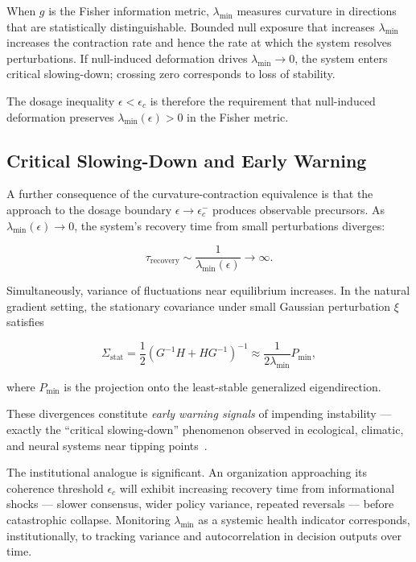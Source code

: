\documentclass[11pt]{article}
\theoremstyle{remark}
\begin{document}
When $g$ is the Fisher information metric, $\lambda_{\min}$ measures curvature in directions that are statistically distinguishable. Bounded null exposure that increases $\lambda_{\min}$ increases the contraction rate and hence the rate at which the system resolves perturbations. If null-induced deformation drives $\lambda_{\min} \to 0$, the system enters critical slowing-down; crossing zero corresponds to loss of stability.

The dosage inequality $\epsilon < \epsilon_c$ is therefore the requirement that null-induced deformation preserves $\lambda_{\min}(\epsilon) > 0$ in the Fisher metric.

\subsection{Critical Slowing-Down and Early Warning}
\label{sec:slowing_down}

A further consequence of the curvature-contraction equivalence is that the approach to the dosage boundary $\epsilon \to \epsilon_c^-$ produces observable precursors. As $\lambda_{\min}(\epsilon) \to 0$, the system's recovery time from small perturbations diverges:

\[
\tau_{\text{recovery}} \sim \frac{1}{\lambda_{\min}(\epsilon)} \to \infty.
\]

Simultaneously, variance of fluctuations near equilibrium increases. In the natural gradient setting, the stationary covariance under small Gaussian perturbation $\xi$ satisfies

\[
\Sigma_{\text{stat}} = \frac{1}{2} (G^{-1}H + H G^{-1})^{-1} \approx \frac{1}{2\lambda_{\min}} P_{\min},
\]

where $P_{\min}$ is the projection onto the least-stable generalized eigendirection.

These divergences constitute \emph{early warning signals} of impending instability --- exactly the ``critical slowing-down'' phenomenon observed in ecological, climatic, and neural systems near tipping points~\cite{scheffer}.

The institutional analogue is significant. An organization approaching its coherence threshold $\epsilon_c$ will exhibit increasing recovery time from informational shocks --- slower consensus, wider policy variance, repeated reversals --- before catastrophic collapse. Monitoring $\lambda_{\min}$ as a systemic health indicator corresponds, institutionally, to tracking variance and autocorrelation in decision outputs over time.
\end{document}
